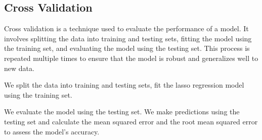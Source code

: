 \documentclass[
]{article}
\newenvironment{Shaded}{\begin{snugshade}}{\end{snugshade}}
\newcommand{\AttributeTok}[1]{\textcolor[rgb]{0.13,0.29,0.53}{#1}}
\newcommand{\ConstantTok}[1]{\textcolor[rgb]{0.56,0.35,0.01}{#1}}
\newcommand{\DecValTok}[1]{\textcolor[rgb]{0.00,0.00,0.81}{#1}}
\newcommand{\FloatTok}[1]{\textcolor[rgb]{0.00,0.00,0.81}{#1}}
\newcommand{\FunctionTok}[1]{\textcolor[rgb]{0.13,0.29,0.53}{\textbf{#1}}}
\newcommand{\NormalTok}[1]{#1}
\newcommand{\OtherTok}[1]{\textcolor[rgb]{0.56,0.35,0.01}{#1}}
\newcommand{\SpecialCharTok}[1]{\textcolor[rgb]{0.81,0.36,0.00}{\textbf{#1}}}
\newcommand{\StringTok}[1]{\textcolor[rgb]{0.31,0.60,0.02}{#1}}
\begin{document}
\subsection{Cross Validation}\label{cross-validation}

Cross validation is a technique used to evaluate the performance of a
model. It involves splitting the data into training and testing sets,
fitting the model using the training set, and evaluating the model using
the testing set. This process is repeated multiple times to ensure that
the model is robust and generalizes well to new data.

We split the data into training and testing sets, fit the lasso
regression model using the training set.

\begin{Shaded}
\end{Shaded}

We evaluate the model using the testing set. We make predictions using
the testing set and calculate the mean squared error and the root mean
squared error to assess the model's accuracy.

\begin{Shaded}
\end{Shaded}
\end{document}
